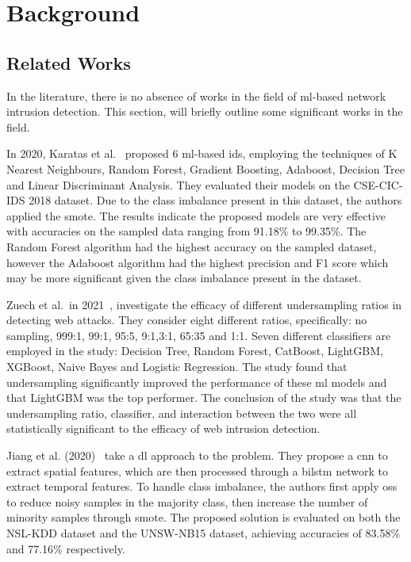 \chapter{Background}%
\label{chp:background}

\section{Related Works}%
\label{sec:related}

In the literature, there is no absence of works in the field of \gls{ml}-based
network intrusion detection. This section, will briefly outline some
significant works in the field.

In 2020, Karatas et al.~\cite{Karatas} proposed 6 \gls{ml}-based \gls{ids},
employing the techniques of K Nearest Neighbours, Random Forest, Gradient
Boosting, Adaboost, Decision Tree and Linear Discriminant Analysis. They
evaluated their models on the CSE-CIC-IDS 2018 dataset. Due to the class
imbalance present in this dataset, the authors applied the \gls{smote}. The
results indicate the proposed models are very effective with accuracies on the
sampled data ranging from 91.18\% to 99.35\%. The Random Forest algorithm had
the highest accuracy on the sampled dataset, however the Adaboost algorithm had
the highest precision and F1 score which may be more significant given the
class imbalance present in the dataset.

Zuech et al.\ in 2021~\cite{Zuech}, investigate the efficacy of different
undersampling ratios in detecting web attacks. They consider eight different
ratios, specifically: no sampling, 999:1, 99:1, 95:5, 9:1,3:1, 65:35 and 1:1.
Seven different classifiers are employed in the study: Decision Tree, Random
Forest, CatBoost, LightGBM, XGBoost, Naive Bayes and Logistic Regression. The
study found that undersampling significantly improved the performance of these
\gls{ml} models and that LightGBM was the top performer. The conclusion of the
study was that the undersampling ratio, classifier, and interaction between the
two were all statistically significant to the efficacy of web intrusion
detection.

Jiang et al. (2020)~\cite{Jiang} take a \gls{dl} approach to the problem. They
propose a \gls{cnn} to extract spatial features, which are then processed
through a \gls{bilstm} network to extract temporal features. To handle class
imbalance, the authors first apply \gls{oss} to reduce noisy samples in the
majority class, then increase the number of minority samples through
\gls{smote}. The proposed solution is evaluated on both the NSL-KDD dataset and
the UNSW-NB15 dataset, achieving accuracies of 83.58\% and 77.16\%
respectively.

